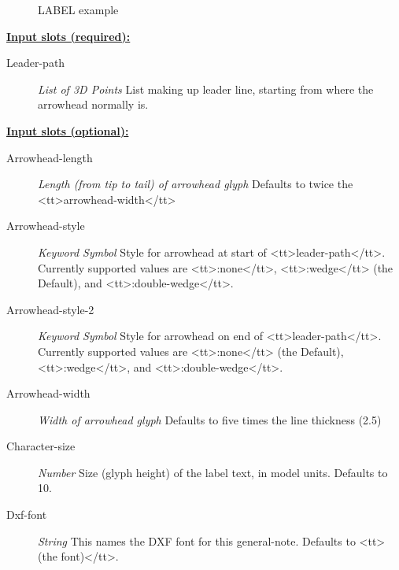 \documentclass [11pt]{book}
\begin{document}
\begin{itemize}
\begin{figure}
\caption{LABEL example}

\label{fig:LABEL}

\end{figure}





\textbf{
\underline{Input slots (required):}}

\begin{description}

\item [Leader-path]
\emph{List of 3D Points} List making up leader line, starting from where the arrowhead normally is.


\end{description}






\textbf{
\underline{Input slots (optional):}}

\begin{description}

\item [Arrowhead-length]
\emph{Length (from tip to tail) of arrowhead glyph} Defaults to twice the <tt>arrowhead-width</tt>


\item [Arrowhead-style]
\emph{Keyword Symbol} Style for arrowhead at start of <tt>leader-path</tt>. Currently supported values
are <tt>:none</tt>, <tt>:wedge</tt>  (the Default), and <tt>:double-wedge</tt>.


\item [Arrowhead-style-2]
\emph{Keyword Symbol} Style for arrowhead on end of <tt>leader-path</tt>. Currently supported values
are <tt>:none</tt> (the Default), <tt>:wedge</tt>, and <tt>:double-wedge</tt>.


\item [Arrowhead-width]
\emph{Width of arrowhead glyph} Defaults to five times the line thickness (2.5)


\item [Character-size]
\emph{Number} Size (glyph height) of the label text, in model units. Defaults to 10.


\item [Dxf-font]
\emph{String} This names the DXF font for this general-note. Defaults to <tt>(the font)</tt>.



\end{description}
\end{itemize}
\end{document}
